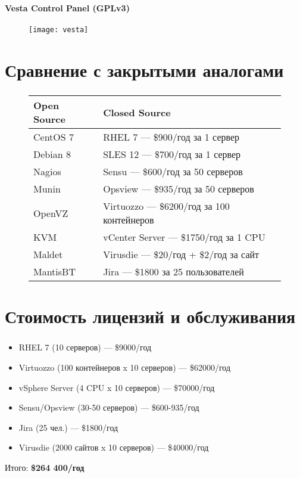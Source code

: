 \begin{frame}
\frametitle{\insertsection}
\framesubtitle{Vesta Control Panel (GPLv3)}
\begin{figure}[h]
	\center
	\texttt{[image: vesta]}
\end{figure}
\end{frame}


\section{Сравнение с закрытыми аналогами}

\begin{frame}
\frametitle{\insertsection}
\begin{figure}[h]
	\begin{tabular}{|l|l|}
		\hline
		\bf{Open Source} & \bf{Closed Source} \\ \hline
		CentOS 7 & RHEL 7 --- \$900/год за 1 сервер \\
		Debian 8 & SLES 12 --- \$700/год за 1 сервер \\ \hline
		Nagios & Sensu --- \$600/год за 50 серверов \\
		Munin & Opsview --- \$935/год за 50 серверов \\ \hline
		OpenVZ & Virtuozzo --- \$6200/год за 100 контейнеров \\
		KVM & vCenter Server --- \$1750/год за 1 CPU \\ \hline
		Maldet & Virusdie --- \$20/год + \$2/год за сайт \\
		MantisBT & Jira --- \$1800 за 25 пользователей \\ \hline
	\end{tabular}
\end{figure}
\end{frame}


\section{Стоимость лицензий и обслуживания}

\begin{frame}
\frametitle{\insertsection}
\begin{itemize}
	\item RHEL 7 (10 серверов) --- \$9000/год
	\item Virtuozzo (100 контейнеров x 10 серверов) --- \$62000/год
	\item vSphere Server (4 CPU x 10 серверов) --- \$70000/год
	\item Sensu/Opsview (30-50 серверов) --- \$600-935/год
	\item Jira (25 чел.) --- \$1800/год
	\item Virusdie (2000 сайтов x 10 серверов) --- \$40000/год
\end{itemize}
Итого: \bf{\$264 400/год}
\end{frame}

